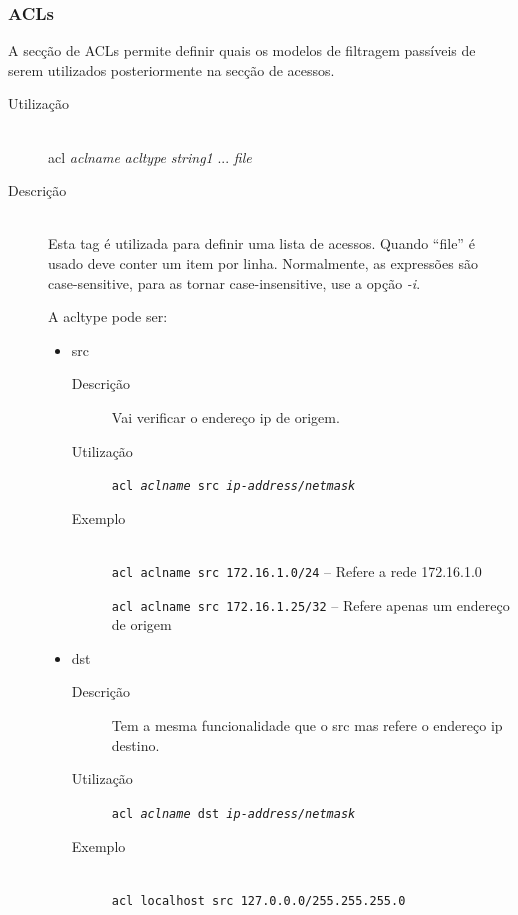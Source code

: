 \subsubsection{ACLs}

A secção de ACLs permite definir quais os modelos de filtragem
passíveis de serem utilizados posteriormente na secção de
acessos.


\begin{description}
\item[Utilização]~\\
acl \emph{aclname} \emph{acltype} \emph{string1} ... \textbar{} \emph{file}

\item[Descrição]~\\
Esta tag é utilizada para definir uma lista de acessos.
Quando ``file'' é usado deve conter um item por linha.
Normalmente, as expressões são case-sensitive, para as tornar
case-insensitive, use a opção \emph{-i}.

A acltype pode ser:

\begin{itemize}
\item src
\begin{description}
\item[Descrição] Vai verificar o endereço ip de origem.

\item[Utilização] \texttt{acl \emph{aclname} src
\emph{ip-address/netmask}}

\item[Exemplo]~\\
\texttt{acl aclname src 172.16.1.0/24} -- Refere a rede 172.16.1.0

\texttt{acl aclname src 172.16.1.25/32} -- Refere apenas um endereço de
origem
\end{description}

\item dst
\begin{description}
\item[Descrição] Tem a mesma funcionalidade que o src mas
refere o endereço ip destino.

\item[Utilização] \texttt{acl \emph{aclname} dst
\emph{ip-address/netmask}}

\item[Exemplo]~\\
\texttt{acl localhost src 127.0.0.0/255.255.255.0}
\end{description}
\end{itemize}
\end{description}

